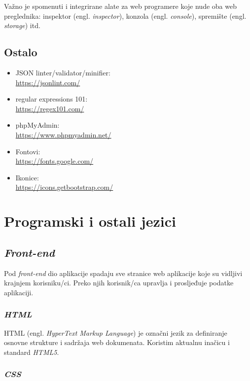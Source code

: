     Važno je spomenuti i integrirane alate za web programere koje nude oba web
    preglednika: inspektor (engl. \textit{inspector}), konzola (engl.
    \textit{console}), spremište (engl. \textit{storage}) itd.

  \subsection{Ostalo}

    \begin{itemize}
      \item JSON linter/validator/minifier: \\ \url{https://jsonlint.com/}
      \item regular expressions 101: \\ \url{https://regex101.com/}
      \item phpMyAdmin: \\ \url{https://www.phpmyadmin.net/}
      \item Fontovi: \\ \url{https://fonts.google.com/}
      \item Ikonice: \\ \url{https://icons.getbootstrap.com/}
    \end{itemize}

\section{Programski i ostali jezici}

  \subsection{\textit{Front-end}}

  Pod \textit{front-end} dio aplikacije spadaju sve stranice web aplikacije koje
  su vidljivi krajnjem korisniku/ci. Preko njih korisnik/ca upravlja i
  prosljeđuje podatke aplikaciji.

    \subsubsection*{\textit{HTML}}

      HTML (engl. \textit{HyperText Markup Language}) je označni jezik za
      definiranje osnovne strukture i sadržaja web dokumenata. Koristim aktualnu
      inačicu i standard \textit{HTML5}.

    \subsubsection*{\textit{CSS}}

